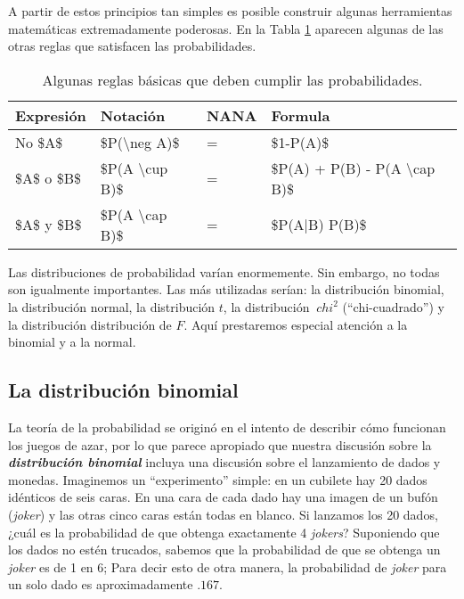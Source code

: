 \documentclass[
]{book}
\begin{document}
A partir de estos principios tan simples es posible construir algunas herramientas matemáticas extremadamente poderosas. En la Tabla \ref{tab:probrules} aparecen algunas de las otras reglas que satisfacen las probabilidades.

\begin{table}

\caption{\label{tab:probrules}Algunas reglas básicas que deben cumplir las probabilidades.}
\centering
\begin{tabular}[t]{l|l|l|l}
\hline
Expresión & Notación & NANA & Formula\\
\hline
No \$A\$ & \$P(\textbackslash{}neg A)\$ & = & \$1-P(A)\$\\
\hline
\$A\$ o \$B\$ & \$P(A \textbackslash{}cup B)\$ & = & \$P(A) + P(B) - P(A \textbackslash{}cap B)\$\\
\hline
\$A\$ y \$B\$ & \$P(A \textbackslash{}cap B)\$ & = & \$P(A|B) P(B)\$\\
\hline
\end{tabular}
\end{table}

Las distribuciones de probabilidad varían enormemente. Sin embargo, no todas son igualmente importantes. Las más utilizadas serían: la distribución binomial, la distribución normal, la distribución \(t\), la distribución \(\ chi^2\) (``chi-cuadrado'') y la distribución distribución de \(F\). Aquí prestaremos especial atención a la binomial y a la normal.

\hypertarget{la-distribuciuxf3n-binomial}{%
\subsection{La distribución binomial}\label{la-distribuciuxf3n-binomial}}

La teoría de la probabilidad se originó en el intento de describir cómo funcionan los juegos de azar, por lo que parece apropiado que nuestra discusión sobre la \textbf{\emph{distribución binomial}} incluya una discusión sobre el lanzamiento de dados y monedas. Imaginemos un ``experimento'' simple: en un cubilete hay 20 dados idénticos de seis caras. En una cara de cada dado hay una imagen de un bufón (\emph{joker}) y las otras cinco caras están todas en blanco. Si lanzamos los 20 dados, ¿cuál es la probabilidad de que obtenga exactamente 4 \emph{jokers}? Suponiendo que los dados no estén trucados, sabemos que la probabilidad de que se obtenga un \emph{joker} es de 1 en 6; Para decir esto de otra manera, la probabilidad de \emph{joker} para un solo dado es aproximadamente \(.167\).
\end{document}
